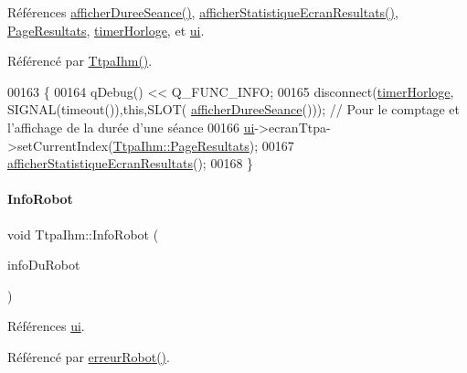 Références \hyperlink{class_ttpa_ihm_a266897eb263e584b40fc2b7c26347623}{afficher\+Duree\+Seance()}, \hyperlink{class_ttpa_ihm_aa480a02532144d0f99af027b5b201ae1}{afficher\+Statistique\+Ecran\+Resultats()}, \hyperlink{class_ttpa_ihm_aad886f2c7b90b4f990492092f0be9c2bab8d5cb877cbb72b194dbaf4f834fbc23}{Page\+Resultats}, \hyperlink{class_ttpa_ihm_a447ad7262efa01d22bc3222e0e470087}{timer\+Horloge}, et \hyperlink{class_ttpa_ihm_ad5fae1222a667da158c26f3d0f0dce23}{ui}.



Référencé par \hyperlink{class_ttpa_ihm_ab3ed4b37a93ff04842414d4a98861d66}{Ttpa\+Ihm()}.


\begin{DoxyCode}
00163 \{
00164     qDebug() << Q\_FUNC\_INFO;
00165     disconnect(\hyperlink{class_ttpa_ihm_a447ad7262efa01d22bc3222e0e470087}{timerHorloge}, SIGNAL(timeout()),\textcolor{keyword}{this},SLOT(
      \hyperlink{class_ttpa_ihm_a266897eb263e584b40fc2b7c26347623}{afficherDureeSeance}())); \textcolor{comment}{// Pour le comptage et l'affichage de la durée d'une séance}
00166     \hyperlink{class_ttpa_ihm_ad5fae1222a667da158c26f3d0f0dce23}{ui}->ecranTtpa->setCurrentIndex(\hyperlink{class_ttpa_ihm_aad886f2c7b90b4f990492092f0be9c2bab8d5cb877cbb72b194dbaf4f834fbc23}{TtpaIhm::PageResultats});
00167     \hyperlink{class_ttpa_ihm_aa480a02532144d0f99af027b5b201ae1}{afficherStatistiqueEcranResultats}();
00168 \}
\end{DoxyCode}
\mbox{\label{class_ttpa_ihm_a1101f9766b4e90844576c1d6b7e2ea23}} 
\paragraph{\texorpdfstring{Info\+Robot}{InfoRobot}}
{\footnotesize\ttfamily void Ttpa\+Ihm\+::\+Info\+Robot (\begin{DoxyParamCaption}\item[{Q\+String}]{info\+Du\+Robot }\end{DoxyParamCaption})\hspace{0.3cm}{\ttfamily [slot]}}



Références \hyperlink{class_ttpa_ihm_ad5fae1222a667da158c26f3d0f0dce23}{ui}.



Référencé par \hyperlink{class_ttpa_ihm_a3a2380e2259f7b5bb1fd4d2ae470e06d}{erreur\+Robot()}.


